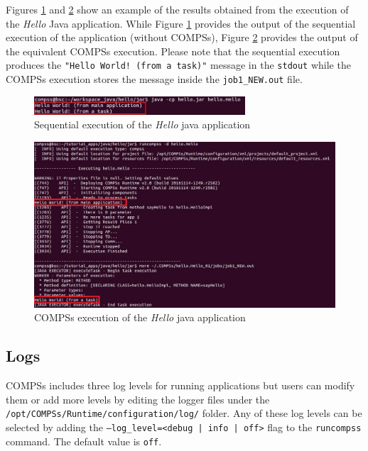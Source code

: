 Figures \ref{fig:hello_seq} and \ref{fig:hello_compss} show an example of the results obtained from the execution of the \textit{Hello} Java 
 application. While Figure \ref{fig:hello_seq} provides the output of the sequential execution of the application (without COMPSs), Figure \ref{fig:hello_compss}
provides the output of the equivalent COMPSs execution. Please note that the sequential execution produces the \texttt{"Hello World! (from a task)"} message
in the \texttt{stdout} while the COMPSs execution stores the message inside the \texttt{job1\_NEW.out} file.
\begin{figure}[h!]
  \centering
    \includegraphics[width=0.7\textwidth]{./Sections/3_Results_and_Logs/Figures/hello_seq_stdout.jpeg}
    \caption{Sequential execution of the \textit{Hello} java application}
    \label{fig:hello_seq}
\end{figure}

\begin{figure}[h!]
  \centering
    \includegraphics[width=\textwidth]{./Sections/3_Results_and_Logs/Figures/hello_compss_stdout_and_job.jpeg}
    \caption{COMPSs execution of the \textit{Hello} java application}
    \label{fig:hello_compss}
\end{figure}
\newpage

\subsection{Logs}
COMPSs includes three log levels for running applications but users can modify them or add more levels by editing the
logger files under the \texttt{/opt/COMPSs/Runtime/configuration/log/} folder. Any of these log levels can be selected by 
adding the \texttt{--log\_level=<debug | info | off>} flag to the \texttt{runcompss} command. The default value is \texttt{off}.


